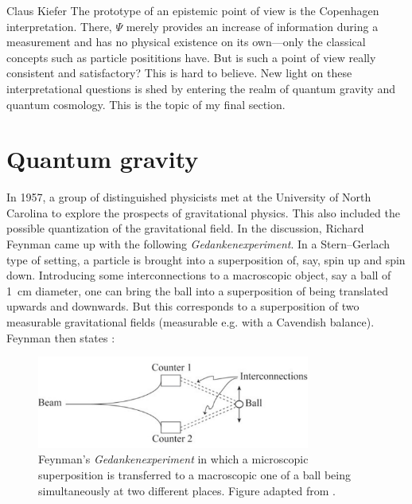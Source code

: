 \begin{artengenv}{Claus Kiefer}
The prototype of an epistemic point of view is the Copenhagen
interpretation. There, $\Psi$ merely provides an increase of information
during a measurement and has no physical existence on its own---only
the classical concepts such as particle posititions have. But is such
a point of view really consistent and satisfactory?  This is hard to
believe. New light on these interpretational questions is shed by
entering the realm of quantum gravity and quantum cosmology. This is
the topic of my final section.

 

\section{Quantum gravity}


In 1957, a group of distinguished physicists met at the University of
North Carolina to explore the prospects of gravitational physics.
This also included the possible quantization of the
gravitational field. In the discussion, Richard Feynman came up with
the following 
\textit{Gedankenexperiment}. In a Stern--Gerlach type of setting, a particle
is brought into a superposition of, say, spin up and spin
down. Introducing some interconnections to a macroscopic object, say
a ball of 1~cm diameter, one can bring the ball into a superposition of being
translated upwards and downwards. But this corresponds to a
superposition of two measurable gravitational fields (measurable e.g. with a
Cavendish balance). Feynman then states \parencite{de_witt_proceedings:_1957}:


\begin{figure}[h]
	\centering
   \includegraphics[width=0.8\textwidth]{ART_Kiefer/Kiefer_img.pdf} 
\caption{Feynman's \textit{Gedankenexperiment} in which a microscopic
  superposition is transferred to a macroscopic one of a ball being
  simultaneously at two different places. Figure adapted from \parencite{de_witt_proceedings:_1957}.}
\end{figure}


\end{artengenv}
